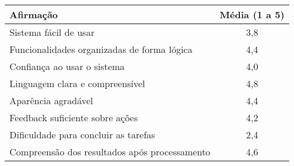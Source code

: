 \begin{center}
\begin{tabular}{|l|c|}
\hline
\textbf{Afirmação} & \textbf{Média (1 a 5)} \\
\hline
Sistema fácil de usar & 3,8 \\
Funcionalidades organizadas de forma lógica & 4,4 \\
Confiança ao usar o sistema & 4,0 \\
Linguagem clara e compreensível & 4,8 \\
Aparência agradável & 4,4 \\
Feedback suficiente sobre ações & 4,2 \\
Dificuldade para concluir as tarefas & 2,4 \\
Compreensão dos resultados após processamento & 4,6 \\
\hline
\end{tabular}
\end{center}